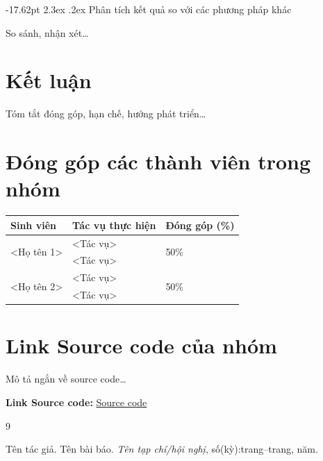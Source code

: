 \documentclass[a4paper]{report}
\makeatletter
\renewcommand\section{\@startsection{section}{1}{\z@}%
    {-17.62pt \@plus -5.89pt \@minus -1.18pt}%
    {2.3ex \@plus .2ex}%
    {\normalfont\fontsize{14.95pt}{16.31pt}\selectfont\bfseries}}
\makeatother
\begin{document}
\section{Phân tích kết quả so với các phương pháp khác}

So sánh, nhận xét\dots

\chapter{Kết luận}

Tóm tắt đóng góp, hạn chế, hướng phát triển\dots

\chapter*{Đóng góp các thành viên trong nhóm}

\begin{tabular}{|p{49.4mm}|p{80.1mm}|p{25.1mm}|}
\hline
\textbf{Sinh viên} & \textbf{Tác vụ thực hiện} & \textbf{Đóng góp (\%)} \\
\hline
\multirow{2}{*}{<Họ tên 1>}
    & <Tác vụ>           & \multirow{2}{*}{50\%} \\
    & <Tác vụ>           & \\
\hline
\multirow{2}{*}{<Họ tên 2>}
    & <Tác vụ>           & \multirow{2}{*}{50\%} \\
    & <Tác vụ>           & \\
\hline
\end{tabular}

\chapter*{Link Source code của nhóm}

Mô tả ngắn về source code\dots

\textbf{Link Source code:} \href{https://example.com}{Source code}

\begin{thebibliography}{9}

Tên tác giả. Tên bài báo. \textit{Tên tạp chí/hội nghị}, số(kỳ):trang--trang, năm.

\end{thebibliography}
\end{document}
